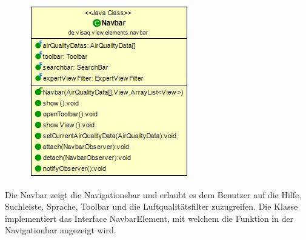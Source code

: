 \begin{minipage}{0.3\textwidth}
    \begin{figure}[H]
        \includegraphics[scale = 0.5]{media/frontend/view/de.view.elements.navbar/Navbar_Class.png}
    \end{figure}
    \end{minipage} \hfill
    \begin{minipage}{0.6\textwidth}
Die Navbar zeigt die Navigationsbar und erlaubt es dem Benutzer auf die Hilfe, Suchleiste, Sprache, Toolbar und die Luftqualitätsfilter zuzugreifen.  Die Klasse implementiert das Interface NavbarElement, mit welchem die Funktion in der Navigationbar angezeigt wird.
\end{minipage}

